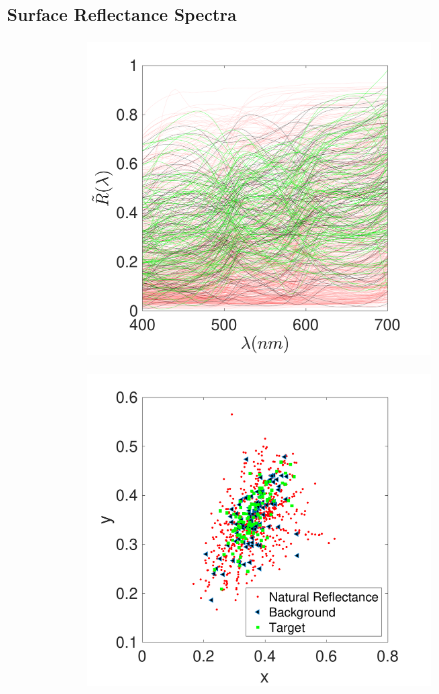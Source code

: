 \documentclass{jov}
\begin{document}
\subsubsection{Surface Reflectance Spectra}
\begin{figure}
\centering
	\begin{subfigure}{0.24 \textwidth}
    \centering
            \caption{}
        \includegraphics[width=\textwidth]{../Figures/Figure7/Figure7_a.pdf}
        \label{fig:reflectanceSpectra}
    \end{subfigure}
    \begin{subfigure}{0.24 \textwidth}
    \centering
        \caption{}
        \includegraphics[width=\textwidth]{../Figures/Figure7/Figure7_b.pdf}

\end{subfigure}
\end{figure}
\end{document}
